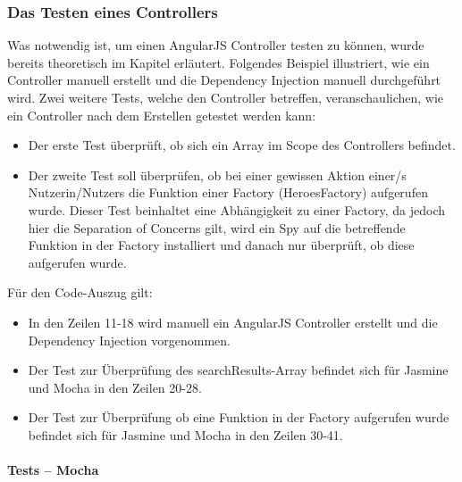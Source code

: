 \subsubsection{Das Testen eines Controllers}
Was notwendig ist, um einen AngularJS Controller testen zu können, wurde bereits theoretisch im Kapitel  erläutert. Folgendes Beispiel illustriert, wie ein Controller manuell erstellt und die Dependency Injection manuell durchgeführt wird. Zwei weitere Tests, welche den Controller betreffen, veranschaulichen, wie ein Controller nach dem Erstellen getestet werden kann:
\begin{itemize}
  \item Der erste Test überprüft, ob sich ein  Array im Scope des Controllers befindet.
  \item Der zweite Test soll überprüfen, ob bei einer gewissen Aktion einer/s Nutzerin/Nutzers die Funktion einer Factory (HeroesFactory) aufgerufen wurde. Dieser Test beinhaltet eine Abhängigkeit zu einer Factory, da jedoch hier die Separation of Concerns gilt, wird ein Spy auf die betreffende Funktion in der Factory installiert und danach nur überprüft, ob diese aufgerufen wurde.
\end{itemize}

Für den Code-Auszug gilt:
\begin{itemize}
  \item In den Zeilen 11-18 wird manuell ein AngularJS Controller erstellt und die Dependency Injection vorgenommen.
  \item Der Test zur Überprüfung des searchResults-Array befindet sich für Jasmine und Mocha in den Zeilen 20-28.
  \item Der Test zur Überprüfung ob eine Funktion in der Factory aufgerufen wurde befindet sich für Jasmine und Mocha in den Zeilen 30-41.
\end{itemize} 

\paragraph{Tests -- Mocha}

